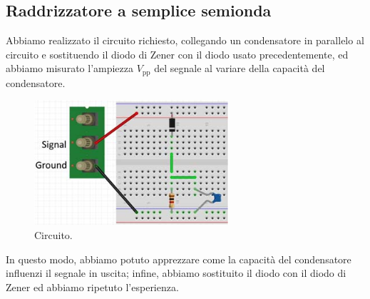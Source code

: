 \documentclass[a4paper]{article}
\begin{document}
		\subsection{Raddrizzatore a semplice semionda}
			Abbiamo realizzato il circuito richiesto, collegando un condensatore in parallelo al circuito e sostituendo il diodo di Zener con il diodo usato precedentemente, ed abbiamo misurato l'ampiezza $ V_{\mathrm{pp}} $ del segnale al variare della capacità del condensatore.
			\begin{figure}[h!]
				\centering
				\includegraphics[scale=0.7]{raddrizzatoreASempliceSemiondaCircuito}
				\caption{Circuito.}
				\label{fig:raddrizzatoreASempliceSemiondaCircuito}
			\end{figure}
			\newpage
			In questo modo, abbiamo potuto apprezzare come la capacità del condensatore influenzi il segnale in uscita; infine, abbiamo sostituito il diodo con il diodo di Zener ed abbiamo ripetuto l'esperienza.
\end{document}
